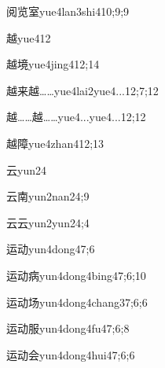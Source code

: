 \begin{verbete}{阅览室}{yue4lan3shi4}{10;9;9}
\end{verbete}
\begin{verbete}{越}{yue4}{12}
\end{verbete}
\begin{verbete}{越境}{yue4jing4}{12;14}
\end{verbete}
\begin{verbete}{越来越……}{yue4lai2yue4...}{12;7;12}
\end{verbete}
\begin{verbete}{越……越……}{yue4...yue4...}{12;12}
\end{verbete}
\begin{verbete}{越障}{yue4zhan4}{12;13}
\end{verbete}
\begin{verbete}{云}{yun2}{4}
\end{verbete}
\begin{verbete}{云南}{yun2nan2}{4;9}
\end{verbete}
\begin{verbete}{云云}{yun2yun2}{4;4}
\end{verbete}
\begin{verbete}{运动}{yun4dong4}{7;6}
\end{verbete}
\begin{verbete}{运动病}{yun4dong4bing4}{7;6;10}
\end{verbete}
\begin{verbete}{运动场}{yun4dong4chang3}{7;6;6}
\end{verbete}
\begin{verbete}{运动服}{yun4dong4fu4}{7;6;8}
\end{verbete}
\begin{verbete}{运动会}{yun4dong4hui4}{7;6;6}
\end{verbete}
